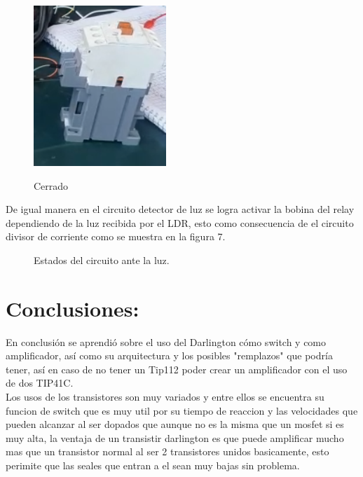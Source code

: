 \documentclass[letterpaper]{article}
\begin{document}
\begin{figure}[htbp]
    \centering
    \includegraphics[width=5cm]{IMG/releisoteOff.PNG}\\
    \caption{Cerrado}
    \label{fig:OFF}
\end{figure}
\newpage
\begin{large}
    De igual manera en el circuito detector de luz se logra activar la bobina del relay dependiendo de la luz recibida por el LDR, esto como consecuencia de el circuito divisor de corriente como se muestra en la figura 7.\\
    \begin{figure}[htbp]
        \centering
        \caption{Estados del circuito ante la luz.}
    \end{figure}
\end{large}
\section{Conclusiones:}
En conclusión se aprendió sobre el uso del Darlington cómo switch y como amplificador, así como su arquitectura y los posibles "remplazos" que podría tener, así en caso de no tener un Tip112 poder crear un amplificador con el uso de dos TIP41C.\\
Los usos de los transistores son muy variados y entre ellos se encuentra su funcion de switch que es muy util por su tiempo de reaccion y las velocidades que pueden alcanzar al ser dopados que aunque no es la misma que un mosfet si es muy alta, la ventaja de un transistir darlington es que puede amplificar mucho mas que un transistor normal al ser 2 transistores unidos basicamente, esto perimite que las seales que entran a el sean muy bajas sin problema.
\end{document}
